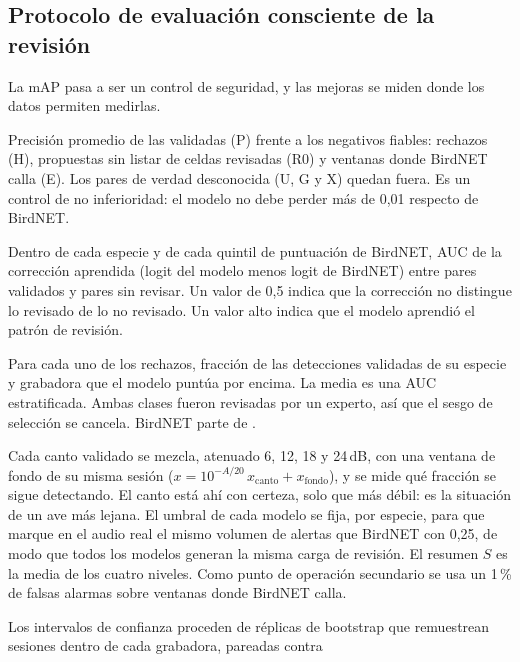 \subsection{Protocolo de evaluación consciente de la revisión}\label{sec:protocolo}
La mAP pasa a ser un control de seguridad, y las mejoras se miden donde los datos permiten medirlas.
\begin{description}[leftmargin=1em]
  \item[M1, mAP limpia.] Precisión promedio de las validadas (P) frente a los negativos fiables: rechazos (H), propuestas sin listar de celdas
        revisadas (R0) y ventanas donde BirdNET calla (E). Los pares de verdad desconocida (U, G y X) quedan fuera. Es un control de no
        inferioridad: el modelo no debe perder más de 0,01 respecto de BirdNET.
  \item[SLI, índice de fuga de selección.] Dentro de cada especie y de cada quintil de puntuación de BirdNET, AUC de la corrección aprendida
        (logit del modelo menos logit de BirdNET) entre pares validados y pares sin revisar. Un valor de 0,5 indica que la corrección no distingue
        lo revisado de lo no revisado. Un valor alto indica que el modelo aprendió el patrón de revisión.
  \item[M2, colocación de los rechazos.] Para cada uno de los \deepRejections{} rechazos, fracción de las detecciones validadas de su especie y
        grabadora que el modelo puntúa por encima. La media es una AUC estratificada. Ambas clases fueron revisadas por un experto, así que el
        sesgo de selección se cancela. BirdNET parte de \deepRejBirdnet.
  \item[M3, cantos atenuados.] Cada canto validado se mezcla, atenuado 6, 12, 18 y 24\,dB, con una ventana de fondo de su misma sesión
        ($x = 10^{-A/20}\,x_{\text{canto}} + x_{\text{fondo}}$), y se mide qué fracción se sigue detectando. El canto está ahí con certeza,
        solo que más débil: es la situación de un ave más lejana. El umbral de cada modelo se fija, por especie, para que marque en el audio real
        el mismo volumen de alertas que BirdNET con 0,25, de modo que todos los modelos generan la misma carga de revisión. El resumen $S$ es la media
        de los cuatro niveles. Como punto de operación secundario se usa un 1\,\% de falsas alarmas sobre ventanas donde BirdNET calla.
\end{description}
Los intervalos de confianza proceden de \deepReps{} réplicas de bootstrap que remuestrean sesiones dentro de cada grabadora, pareadas contra
